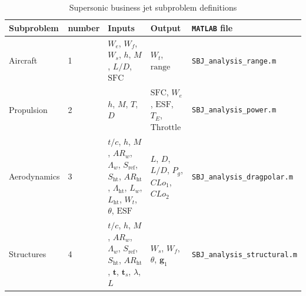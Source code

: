 \documentclass[11pt]{article}
\begin{document}
\begin{table}[h!]
  \centering
  \renewcommand{\arraystretch}{1.0}%
  \small\addtolength{\tabcolsep}{-1pt}
  \caption{Supersonic business jet subproblem definitions}
  \label{table:subproblem}
  \begin{tabular}{L{2cm}C{1cm}C{4cm}C{4cm}R{5cm}}
    \hline\hline
    \bf Subproblem          & \bf number  & \bf Inputs                                                                                                                                                      & \bf Output                                                      & \bf \texttt{MATLAB} file              \\ \hline
    Aircraft                & 1           & $W_e$, $W_f$, $W_s$, $h$, $M$, $L/D$, $\text{SFC}$                                                                                                              & $W_t$, $\text{range}$     		                                  & \texttt{SBJ\_analysis\_range.m}       \\ \hline
    Propulsion 	            & 2           & $h$, $M$, $T$, $D$                                                                                                                                              & $\text{SFC}$, $W_e$, $\text{ESF}$, $T_{E}$, $\text{Throttle}$   & \texttt{SBJ\_analysis\_power.m}       \\ \hline
    Aerodynamics 	          & 3           & $t/c$, $h$, $M$, $AR_w$, $\Lambda_w$, $S_\text{ref}$, $S_\text{ht}$, $AR_\text{ht}$, $\Lambda_\text{ht}$, $L_w$, $L_\text{ht}$, $W_t$, $\theta$, $\text{ESF}$   & $L$, $D$, $L/D$, $P_g$, $CLo_1$, $CLo_2$                        & \texttt{SBJ\_analysis\_dragpolar.m}   \\ \hline
    Structures 		          & 4           & $t/c$, $h$, $M$, $AR_w$, $\Lambda_w$, $S_\text{ref}$, $S_\text{ht}$, $AR_\text{ht}$, $\mathbf{t}$, $\mathbf{t}_s$, $\lambda$, $L$                               & $W_s$, $W_f$, $\theta$, $\mathbf{g}_1$                          & \texttt{SBJ\_analysis\_structural.m}  \\ 
    \hline\hline  
  \end{tabular}
\end{table}
\end{document}
